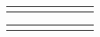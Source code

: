 \documentclass[12pt]{article}
\begin{document}
\begin{landscape}
\begin{center}
\begin{tabular}{A{2cm} A{2cm} A{2cm} A{2cm} A{2cm} A{2cm} A{2cm}}
        \tabularnewline \hline \hline \tabularnewline
    \end{tabular}
    \captionof{}
    \label{bias}
\end{center}


\end{landscape}


\newpage
\thispagestyle{empty}

\begin{landscape}

\begin{center}
    \vspace*{20mm}
    \hspace*{-48mm}
    \begin{tabular}{A{2cm} A{2cm} A{2cm} A{2cm} A{2cm} A{2cm} A{2cm}}
        \hline \hline \tabularnewline
        

\end{tabular}
\end{center}
\end{landscape}
\end{document}
